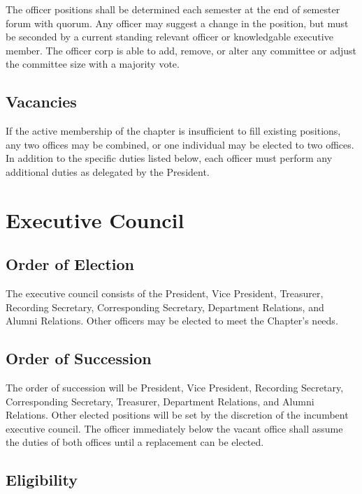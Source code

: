 \documentclass[11pt]{article}
\begin{document}
The officer positions shall be determined each semester at the end of semester forum with quorum.
Any officer may suggest a change in the position, but must be seconded by a current standing relevant officer or knowledgable executive member.
The officer corp is able to add, remove, or alter any committee or adjust the committee size with a majority vote.

\subsection{Vacancies}
\label{sec:org907db3a}

If the active membership of the chapter is insufficient to fill existing positions, any two offices may be combined, or one individual may be elected to two offices.
In addition to the specific duties listed below, each officer must perform any additional duties as delegated by the President.
\section{Executive Council}
\label{sec:org935036a}

\subsection{Order of Election}
\label{sec:org8b15439}

The executive council consists of the President, Vice President, Treasurer, Recording Secretary, Corresponding Secretary, Department Relations, and Alumni Relations. Other officers may be elected to meet the Chapter’s needs.

\subsection{Order of Succession}
\label{sec:org45d9280}

The order of succession will be President, Vice President, Recording Secretary, Corresponding Secretary, Treasurer, Department Relations, and Alumni Relations.
Other elected positions will be set by the discretion of the incumbent executive council.
The officer immediately below the vacant office shall assume the duties of both offices until a replacement can be elected.

\subsection{Eligibility}
\label{sec:org0fd65bb}
\end{document}
